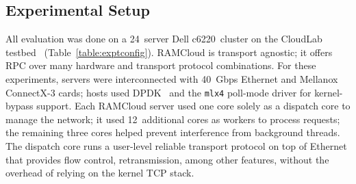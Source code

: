 \begin{description}
\end{description}

\subsection{Experimental Setup}
\label{sec:setup}

All evaluation was done on a 24~server Dell c6220~cluster on the CloudLab
testbed~\cite{cloudlab} (Table~\ref{table:exptconfig}).  RAMCloud is transport
agnostic; it offers RPC over many hardware and transport protocol
combinations.  For these experiments, servers were interconnected with 40~Gbps
Ethernet and Mellanox ConnectX-3 cards; hosts used DPDK~\cite{dpdk} and
the \texttt{mlx4} poll-mode driver for kernel-bypass support.  Each RAMCloud
server used one core solely as a dispatch core to manage the network; it used
12~additional cores as workers to process requests; the remaining
three cores helped prevent interference from background threads. The
dispatch core runs a user-level reliable transport protocol on top of
Ethernet that provides flow control, retransmission, among other
features, without the
overhead of relying on the kernel TCP stack.

